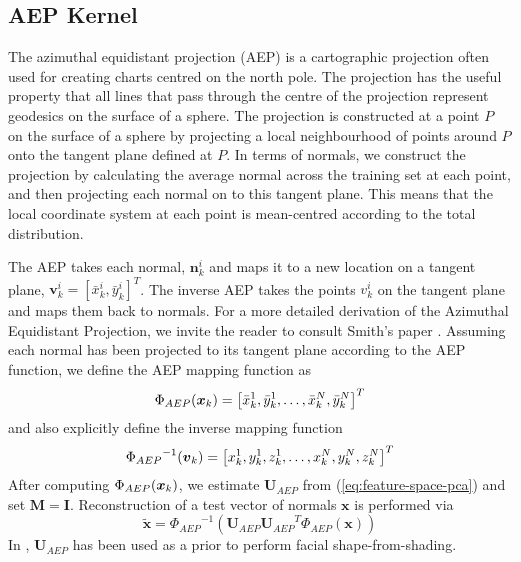 \subsection{AEP Kernel}\label{subsec:aep-kernel}
The azimuthal equidistant projection (AEP) \cite{RefWorks:102,RefWorks:90} is a cartographic projection often used for creating charts centred on the north pole. The projection has the useful property that all lines that pass through the centre of the projection represent geodesics on the surface of a sphere. The projection is constructed at a point $P$ on the surface of a sphere by projecting a local neighbourhood of points around $P$ onto the tangent plane defined at $P$. In terms of normals, we construct the projection by calculating the average normal across the training set at each point, and then projecting each normal on to this tangent plane. This means that the local coordinate system at each point is mean-centred according to the total distribution.

The AEP takes each normal, $\boldsymbol{n}_k^i$ and maps it to a new location on a tangent plane, $\boldsymbol{v}_k^i = [\bar{x}_k^i, \bar{y}_k^i]^T$. The inverse AEP takes the points  $v_k^i$ on the tangent plane and maps them back to normals. For a more detailed derivation of the Azimuthal Equidistant Projection, we invite the reader to consult Smith's paper \cite{RefWorks:90}. Assuming each normal has been projected to its tangent plane according to the AEP function, we define the AEP mapping function as
\begin{equation}\label{eq:aep-kernel}
    \aep = \left[ \bar{x}_k^1, \bar{y}_k^1, \ldots, \bar{x}_k^N, \bar{y}_k^N \right]^T
\end{equation}
and also explicitly define the inverse mapping function
\begin{equation}\label{eq:inv-aep-kernel}
    \invaep = \left[ x_k^1, y_k^1, z_k^1, \dots, x_k^N, y_k^N, z_k^N \right]^T
\end{equation}
After computing $\Phi_{AEP}(\boldsymbol{x}_k)$, we estimate $\boldsymbol{U}_{AEP}$ from (\ref{eq:feature-space-pca}) and set $\boldsymbol{M} = \boldsymbol{I}$. Reconstruction of a test vector of normals $\boldsymbol{x}$ is performed via
\begin{equation}\label{eq:aep-reconstruction}
   \tilde{\boldsymbol{x}} = {\Phi_{AEP}}^{-1} \left( \boldsymbol{U}_{AEP} {\boldsymbol{U}_{AEP}}^T \Phi_{AEP}(\boldsymbol{x}) \right)
\end{equation}
In \cite{RefWorks:90}, $\boldsymbol{U}_{AEP}$ has been used as a prior to perform facial shape-from-shading.
